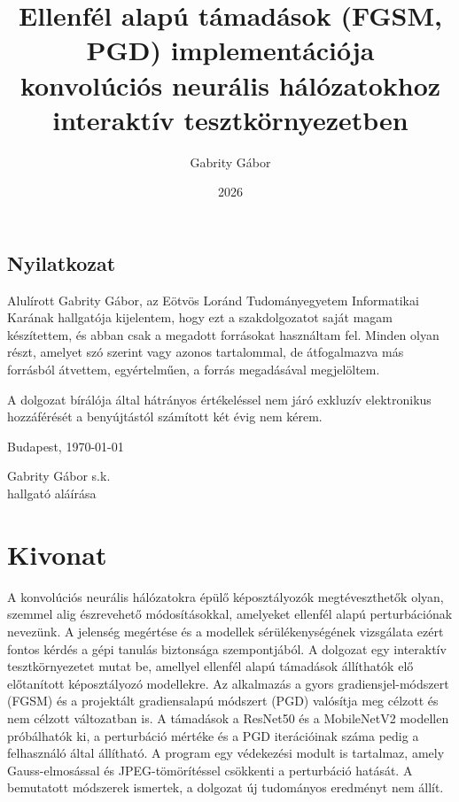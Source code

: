 \documentclass[
]{elteikthesis}[2024/04/26]
\title{Ellenfél alapú támadások (FGSM, PGD) implementációja\\
konvolúciós neurális hálózatokhoz\\
interaktív tesztkörnyezetben}
\date{2026}
\author{Gabrity Gábor}
\affiliation{adjunktus}
\begin{document}

\maketitle

\newpage
\thispagestyle{empty}
\section*{Nyilatkozat}

Alulírott Gabrity Gábor, az Eötvös Loránd Tudományegyetem Informatikai Karának
hallgatója kijelentem, hogy ezt a szakdolgozatot saját magam készítettem, és abban csak a megadott
forrásokat használtam fel. Minden olyan részt, amelyet szó szerint vagy azonos tartalommal, de
átfogalmazva más forrásból átvettem, egyértelműen, a forrás megadásával megjelöltem.

A dolgozat bírálója által hátrányos értékeléssel nem járó exkluzív elektronikus hozzáférését a
benyújtástól számított két évig nem kérem.

\vspace{2cm}

Budapest, \today

\vspace{2cm}
\begin{flushright}
Gabrity Gábor s.k.\\
hallgató aláírása
\end{flushright}

\cleardoublepage

\chapter*{Kivonat}

A konvolúciós neurális hálózatokra épülő képosztályozók megtéveszthetők olyan, szemmel alig észrevehető módosításokkal, amelyeket ellenfél alapú perturbációnak nevezünk. 
A jelenség megértése és a modellek sérülékenységének vizsgálata ezért fontos kérdés a gépi tanulás biztonsága szempontjából. 
A dolgozat egy interaktív tesztkörnyezetet mutat be, amellyel ellenfél alapú támadások állíthatók elő előtanított képosztályozó modellekre. 
Az alkalmazás a gyors gradiensjel-módszert (FGSM) és a projektált gradiensalapú módszert (PGD) valósítja meg célzott és nem célzott változatban is. 
A támadások a ResNet50 és a MobileNetV2 modellen próbálhatók ki, a perturbáció mértéke és a PGD iterációinak száma pedig a felhasználó által állítható. 
A program egy védekezési modult is tartalmaz, amely Gauss-elmosással és JPEG-tömörítéssel csökkenti a perturbáció hatását. 
A bemutatott módszerek ismertek, a dolgozat új tudományos eredményt nem állít. 
\end{document}
